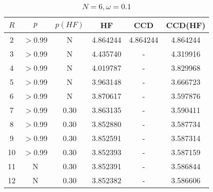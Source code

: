 \begin{table}[H]
    \centering
    \caption{$N = 6, \omega = 0.1$}
    \begin{tabular}{cccccc}
    \toprule
    $R$ & $p$ & $p(HF)$ & HF & CCD & CCD(HF) \\
    \midrule
    2 & $>$0.99 & N & 4.864244 & 4.864244 & 4.864244 \\
    3 & $>$0.99 & N & 4.435740 & - & 4.319916 \\
    4 & $>$0.99 & N & 4.019787 & - & 3.829968 \\
    5 & $>$0.99 & N & 3.963148 & - & 3.666723 \\
    6 & $>$0.99 & N & 3.870617 & - & 3.597876 \\
    7 & $>$0.99 & 0.30 & 3.863135 & - & 3.590411 \\
    8 & $>$0.99 & 0.30 & 3.852880 & - & 3.587734 \\
    9 & $>$0.99 & 0.30 & 3.852591 & - & 3.587314 \\
    10 & $>$0.99 & 0.30 & 3.852393 & - & 3.587159 \\
    11 & N & 0.30 & 3.852391 & - & 3.586844 \\
    12 & N & 0.30 & 3.852382 & - & 3.586606 \\
    \bottomrule
    \end{tabular}
\end{table}
    